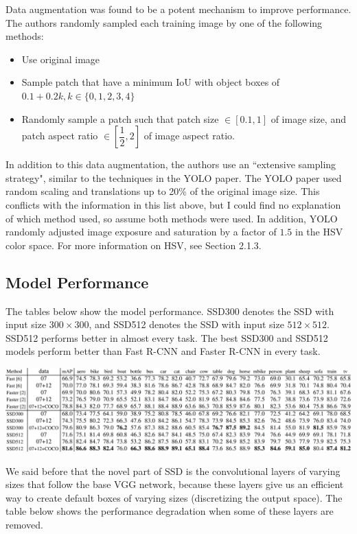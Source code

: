 \documentclass{article}
\begin{document}
Data augmentation was found to be a potent mechanism to improve performance. The authors randomly sampled each training image by one of the following methods:

\begin{itemize}
    \item Use original image
    \item Sample patch that have a minimum IoU with object boxes of $0.1+0.2k, k \in \{0,1,2,3,4\}$
    \item Randomly sample a patch such that patch size $\in [0.1, 1]$ of image size, and patch aspect ratio $\in [\dfrac{1}{2}, 2]$ of image aspect ratio.
\end{itemize}

In addition to this data augmentation, the authors use an ``extensive sampling strategy", similar to the techniques in the YOLO paper. The YOLO paper used random scaling and translations up to 20\% of the original image size. This conflicts with the information in this list above, but I could find no explanation of which method used, so assume both methods were used. In addition, YOLO randomly adjusted image exposure and saturation by a factor of $1.5$ in the HSV color space. For more information on HSV, see Section 2.1.3.


\subsection{Model Performance}

The tables below show the model performance. SSD300 denotes the SSD with input size $300\times300$, and SSD512 denotes the SSD with input size $512\times512$. SSD512 performs better in almost every task. The best SSD300 and SSD512 models perform better than Fast R-CNN and Faster R-CNN in every task.

\begin{center}
\includegraphics[scale=0.33]{ssdresults.PNG}
\end{center}

We said before that the novel part of SSD is the convolutional layers of varying sizes that follow the base VGG network, because these layers give us an efficient way to create default boxes of varying sizes (discretizing the output space). The table below shows the performance degradation when some of these layers are removed.
\end{document}
